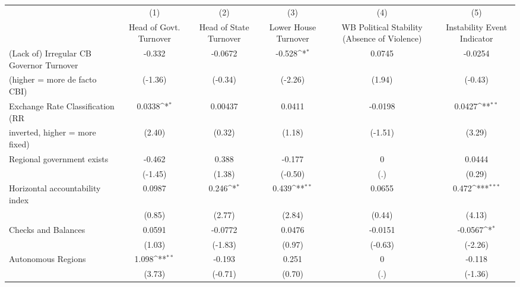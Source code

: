 {
\def\sym#1{\ifmmode^{#1}\else\(^{#1}\)\fi}
\begin{tabular}{l*{5}{c}}
\toprule
                                        &\multicolumn{1}{c}{(1)}&\multicolumn{1}{c}{(2)}&\multicolumn{1}{c}{(3)}&\multicolumn{1}{c}{(4)}&\multicolumn{1}{c}{(5)}\\
                                        &\multicolumn{1}{c}{Head of Govt. Turnover}&\multicolumn{1}{c}{Head of State Turnover}&\multicolumn{1}{c}{Lower House Turnover}&\multicolumn{1}{c}{WB Political Stability (Absence of Violence)}&\multicolumn{1}{c}{Instability Event Indicator}\\
\midrule
(Lack of) Irregular CB Governor Turnover&-0.332         &-0.0672         &-0.528\sym{*}  &0.0745         &-0.0254         \\
(higher = more de facto CBI)            &(-1.36)         &(-0.34)         &(-2.26)         &(1.94)         &(-0.43)         \\
\addlinespace
Exchange Rate Classification (RR        &0.0338\sym{*}  &0.00437         &0.0411         &-0.0198         &0.0427\sym{**} \\
inverted, higher = more fixed)          &(2.40)         &(0.32)         &(1.18)         &(-1.51)         &(3.29)         \\
\addlinespace
Regional government exists              &-0.462         &0.388         &-0.177         &    0         &0.0444         \\
                                        &(-1.45)         &(1.38)         &(-0.50)         &  (.)         &(0.29)         \\
\addlinespace
Horizontal accountability index         &0.0987         &0.246\sym{*}  &0.439\sym{**} &0.0655         &0.472\sym{***}\\
                                        &(0.85)         &(2.77)         &(2.84)         &(0.44)         &(4.13)         \\
\addlinespace
Checks and Balances                     &0.0591         &-0.0772         &0.0476         &-0.0151         &-0.0567\sym{*}  \\
                                        &(1.03)         &(-1.83)         &(0.97)         &(-0.63)         &(-2.26)         \\
\addlinespace
Autonomous Regions                      &1.098\sym{**} &-0.193         &0.251         &    0         &-0.118         \\
                                        &(3.73)         &(-0.71)         &(0.70)         &  (.)         &(-1.36)         \\

\end{tabular}}
